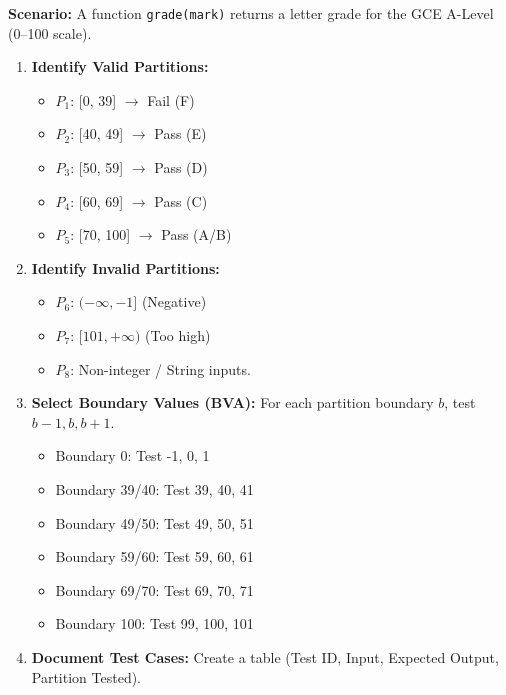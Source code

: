 \documentclass[11pt]{article}
\begin{document}
\begin{methode}
\textbf{Scenario:} A function \texttt{grade(mark)} returns a letter grade for the GCE A-Level (0--100 scale).
\begin{enumerate}
    \item \textbf{Identify Valid Partitions:}
    \begin{itemize}
        \item $P_1$: [0, 39] $\rightarrow$ Fail (F)
        \item $P_2$: [40, 49] $\rightarrow$ Pass (E)
        \item $P_3$: [50, 59] $\rightarrow$ Pass (D)
        \item $P_4$: [60, 69] $\rightarrow$ Pass (C)
        \item $P_5$: [70, 100] $\rightarrow$ Pass (A/B)
    \end{itemize}
    \item \textbf{Identify Invalid Partitions:}
    \begin{itemize}
        \item $P_6$: $(-\infty, -1]$ (Negative)
        \item $P_7$: $[101, +\infty)$ (Too high)
        \item $P_8$: Non-integer / String inputs.
    \end{itemize}
    \item \textbf{Select Boundary Values (BVA):} For each partition boundary $b$, test $b-1, b, b+1$.
    \begin{itemize}
        \item Boundary 0: Test -1, 0, 1
        \item Boundary 39/40: Test 39, 40, 41
        \item Boundary 49/50: Test 49, 50, 51
        \item Boundary 59/60: Test 59, 60, 61
        \item Boundary 69/70: Test 69, 70, 71
        \item Boundary 100: Test 99, 100, 101
    \end{itemize}
    \item \textbf{Document Test Cases:} Create a table (Test ID, Input, Expected Output, Partition Tested).
\end{enumerate}
\end{methode}
\end{document}

